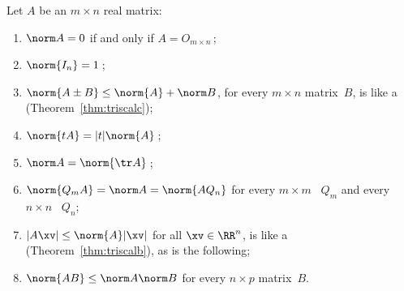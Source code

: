 \begin{theorem} \label{thm:norm} 
Let \(A\) be an \(m\times n\) real matrix:
\begin{enumerate}
\item\label{thm:norm:iii} \(\norm A=0\) if and only if \(A=O_{m\times n}\)\,;
\item\label{thm:norm:vi} \(\norm{I_n}=1\)\,;
\item\label{thm:norm:iv} \(\norm {A\pm B}\leq\norm{A}+\norm B\), for every \(m\times n\) matrix~\(B\), is like a  (Theorem~\ref{thm:triscalc});
\item\label{thm:norm:v} \(\norm{tA}=|t|\norm{A}\)\,;
\item\label{thm:norm:i} \(\norm A=\norm{\tr A}\)\,;
\item\label{thm:norm:ii} \(\norm{Q_mA}=\norm A=\norm{AQ_n}\) for every \(m\times m\) ~\(Q_m\) and every \(n\times n\) ~\(Q_n\);
\item\label{thm:norm:viii} \(|A\xv|\leq\norm{A}|\xv|\) for all \(\xv\in\RR^n\), is like a  (Theorem~\ref{thm:triscalb}), as is the following;
\item\label{thm:norm:vii} \(\norm{AB}\leq\norm A\norm B\) for every \(n\times p\) matrix~\(B\).
\end{enumerate}
\end{theorem}
